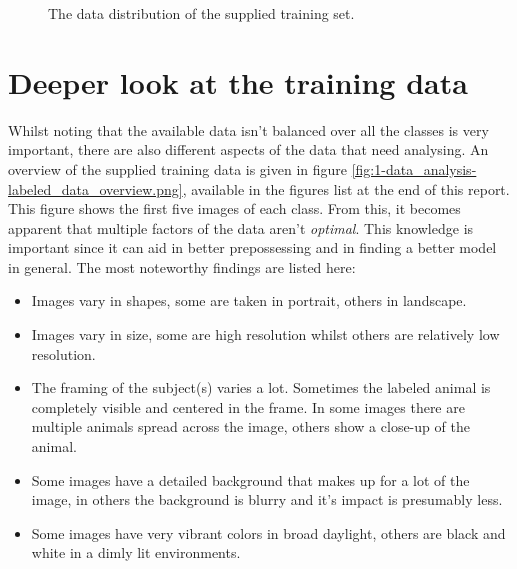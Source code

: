 \begin{figure}[H]
    \centering
    \captionsetup{width=0.7\linewidth}
    \captionsetup{justification=centering}
    \caption{The data distribution of the supplied training set.}
    \label{fig:1-data_analysis-labeled_data_distribution}
\end{figure}


\section{Deeper look at the training data}
\label{section:DA_deeper_look_data}

Whilst noting that the available data isn't balanced over all the classes is very important, there are also different aspects of the data that need analysing. 
An overview of the supplied training data is given in figure \ref{fig:1-data_analysis-labeled_data_overview.png}, available in the figures list at the end of this report.
This figure shows the first five images of each class.
From this, it becomes apparent that multiple factors of the data aren't \emph{optimal}.
This knowledge is important since it can aid in better prepossessing and in finding a better model in general.
The most noteworthy findings are listed here:
\begin{itemize}
    \item Images vary in shapes, some are taken in portrait, others in landscape.
    \item Images vary in size, some are high resolution whilst others are relatively low resolution.
    \item The framing of the subject(s) varies a lot. Sometimes the labeled animal is completely visible and centered in the frame. In some images there are multiple animals spread across the image, others show a close-up of the animal.
    \item Some images have a detailed background that makes up for a lot of the image, in others the background is blurry and it's impact is presumably less.
    \item Some images have very vibrant colors in broad daylight, others are black and white in a dimly lit environments.
\end{itemize}

